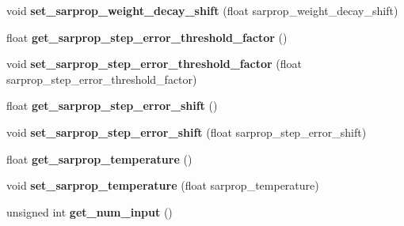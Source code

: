 \begin{DoxyCompactItemize}
\item 
\hypertarget{class_f_a_n_n_1_1neural__net_afacccf1b4e32857f3135ad4df44bb3d4}{void {\bfseries set\-\_\-sarprop\-\_\-weight\-\_\-decay\-\_\-shift} (float sarprop\-\_\-weight\-\_\-decay\-\_\-shift)}\label{class_f_a_n_n_1_1neural__net_afacccf1b4e32857f3135ad4df44bb3d4}

\item 
\hypertarget{class_f_a_n_n_1_1neural__net_a5520cb1f28c8b34746fde7b7df010e92}{float {\bfseries get\-\_\-sarprop\-\_\-step\-\_\-error\-\_\-threshold\-\_\-factor} ()}\label{class_f_a_n_n_1_1neural__net_a5520cb1f28c8b34746fde7b7df010e92}

\item 
\hypertarget{class_f_a_n_n_1_1neural__net_a90aa8749b5325168099c03a7d6efb9cc}{void {\bfseries set\-\_\-sarprop\-\_\-step\-\_\-error\-\_\-threshold\-\_\-factor} (float sarprop\-\_\-step\-\_\-error\-\_\-threshold\-\_\-factor)}\label{class_f_a_n_n_1_1neural__net_a90aa8749b5325168099c03a7d6efb9cc}

\item 
\hypertarget{class_f_a_n_n_1_1neural__net_aa62be1ab30eb38be64df36c82da3d246}{float {\bfseries get\-\_\-sarprop\-\_\-step\-\_\-error\-\_\-shift} ()}\label{class_f_a_n_n_1_1neural__net_aa62be1ab30eb38be64df36c82da3d246}

\item 
\hypertarget{class_f_a_n_n_1_1neural__net_a2baf487092eedae7b86cfaabb1450dd7}{void {\bfseries set\-\_\-sarprop\-\_\-step\-\_\-error\-\_\-shift} (float sarprop\-\_\-step\-\_\-error\-\_\-shift)}\label{class_f_a_n_n_1_1neural__net_a2baf487092eedae7b86cfaabb1450dd7}

\item 
\hypertarget{class_f_a_n_n_1_1neural__net_a33b3f6dab2868d17865dc8a61525757c}{float {\bfseries get\-\_\-sarprop\-\_\-temperature} ()}\label{class_f_a_n_n_1_1neural__net_a33b3f6dab2868d17865dc8a61525757c}

\item 
\hypertarget{class_f_a_n_n_1_1neural__net_a85062857b9699a5317a0a5f0a96c4be0}{void {\bfseries set\-\_\-sarprop\-\_\-temperature} (float sarprop\-\_\-temperature)}\label{class_f_a_n_n_1_1neural__net_a85062857b9699a5317a0a5f0a96c4be0}

\item 
\hypertarget{class_f_a_n_n_1_1neural__net_ad1d37cf87ced59f8c6cc1034a51ecf53}{unsigned int {\bfseries get\-\_\-num\-\_\-input} ()}\label{class_f_a_n_n_1_1neural__net_ad1d37cf87ced59f8c6cc1034a51ecf53}


\end{DoxyCompactItemize}

